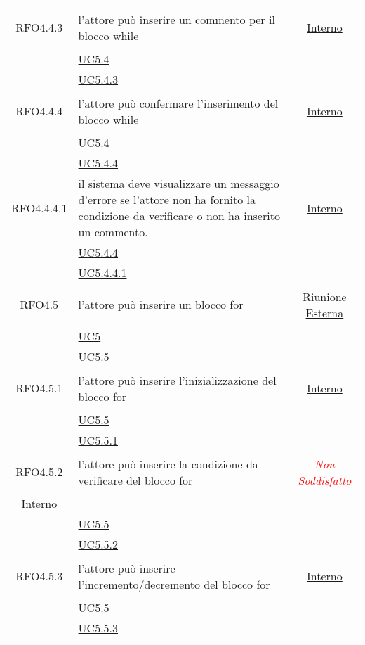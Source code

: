 \begin{longtable}{|c|>{\centering}m{7cm}|c|}
\hypertarget{RFO4.4.3}{RFO4.4.3} & l’attore può inserire un commento per il blocco while & \hyperlink{Interno}{Interno}\\
& \hyperref[UC5.4]{UC5.4}\\
& \hyperref[UC5.4.3]{UC5.4.3}\\ \hline

\hypertarget{RFO4.4.4}{RFO4.4.4} & l’attore può confermare l'inserimento del blocco while & \hyperlink{Interno}{Interno}\\
& \hyperref[UC5.4]{UC5.4}\\
& \hyperref[UC5.4.4]{UC5.4.4}\\ \hline

\hypertarget{RFO4.4.4.1}{RFO4.4.4.1} & il sistema deve visualizzare un messaggio d’errore se l'attore non ha fornito la condizione da verificare o non ha inserito un commento. &\hyperlink{Interno}{Interno}\\
& \hyperref[UC5.4.4]{UC5.4.4}\\
& \hyperref[UC5.4.4.1]{UC5.4.4.1}\\ \hline

\hypertarget{RFO4.5}{RFO4.5} & l'attore può inserire un blocco for &  \hyperlink{Riunione Esterna}{Riunione Esterna}\\
& \hyperref[UC5]{UC5}\\
& \hyperref[UC5.5]{UC5.5}\\ \hline

\hypertarget{RFO4.5.1}{RFO4.5.1} & l'attore può inserire l'inizializzazione del blocco for & \hyperlink{Interno}{Interno}\\
& \hyperref[UC5.5]{UC5.5}\\
& \hyperref[UC5.5.1]{UC5.5.1}\\ \hline

\hypertarget{RFO4.5.2}{RFO4.5.2} & l'attore può inserire la condizione da verificare del blocco for & \textcolor{red}{\textit{Non Soddisfatto}}\\ \hline \hyperlink{Interno}{Interno}\\
& \hyperref[UC5.5]{UC5.5}\\
& \hyperref[UC5.5.2]{UC5.5.2}\\ \hline

\hypertarget{RFO4.5.3}{RFO4.5.3} & l'attore può inserire l'incremento/decremento del blocco for & \hyperlink{Interno}{Interno}\\
& \hyperref[UC5.5]{UC5.5}\\
& \hyperref[UC5.5.3]{UC5.5.3}\\ \hline


\end{longtable}
